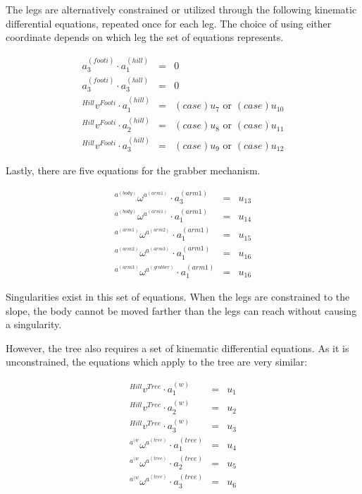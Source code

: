 \documentclass{article}
\begin{document}
The legs are alternatively constrained or utilized through the following kinematic differential equations, repeated once for each leg. The choice of using either coordinate depends on which leg the set of equations represents.

\begin{eqnarray*}
a_3^{(footi)} \cdot a_1^{(hill)} & = & 0 \\
a_3^{(footi)} \cdot a_3^{(hill)} & = & 0 \\
{}^{Hill}v^{Footi} \cdot a_1^{(hill)} & = & (case)u_7 \text{ or } (case)u_{10} \\
{}^{Hill}v^{Footi} \cdot a_2^{(hill)} & = & (case)u_8 \text{ or } (case)u_{11} \\
{}^{Hill}v^{Footi} \cdot a_3^{(hill)} & = & (case)u_9 \text{ or } (case)u_{12}
\end{eqnarray*}

Lastly, there are five equations for the grabber mechanism.

\begin{eqnarray*}
{}^{a^{(body)}}\omega^{a^{(arm1)}} \cdot a_3^{(arm1)} & = & u_{13} \\
{}^{a^{(body)}}\omega^{a^{(arm1)}} \cdot a_1^{(arm1)} & = & u_{14} \\
{}^{a^{(arm1)}}\omega^{a^{(arm2)}} \cdot a_1^{(arm1)} & = & u_{15} \\
{}^{a^{(arm2)}}\omega^{a^{(arm3)}} \cdot a_1^{(arm1)} & = & u_{16} \\
{}^{a^{(arm3)}}\omega^{a^{(grabber)}} \cdot a_1^{(arm1)} & = & u_{16}
\end{eqnarray*}

Singularities exist in this set of equations. When the legs are constrained to the slope, the body cannot be moved farther than the legs can reach without causing a singularity.

However, the tree also requires a set of kinematic differential equations. As it is unconstrained, the equations which apply to the tree are very similar:

\begin{eqnarray*}
{}^{Hill}v^{Tree} \cdot a_1^{(w)} & = & u_1 \\
{}^{Hill}v^{Tree} \cdot a_2^{(w)} & = & u_2 \\
{}^{Hill}v^{Tree} \cdot a_3^{(w)} & = & u_3 \\
{}^{a^{(w}}\omega^{a^{(tree)}} \cdot a_1^{(tree)} & = & u_4 \\
{}^{a^{(w}}\omega^{a^{(tree)}} \cdot a_2^{(tree)} & = & u_5 \\
{}^{a^{(w}}\omega^{a^{(tree)}} \cdot a_3^{(tree)} & = & u_6
\end{eqnarray*}%
\end{document}
